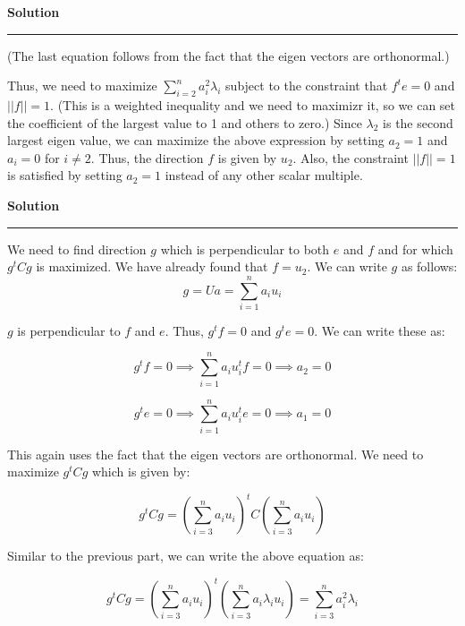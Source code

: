 \documentclass[a4paper,12pt]{article}
\newenvironment{solution}[2][]{%
    \begin{mdframed}[linecolor=blue!70!black, linewidth=2pt, roundcorner=10pt, backgroundcolor=yellow!10!white, skipabove=12pt, skipbelow=12pt]%
        \textbf{\large #2}
        \par\noindent\rule{\textwidth}{0.4pt}
}{
    \end{mdframed}
}
\begin{document}
\begin{solution}{Solution}
(The last equation follows from the fact that the eigen vectors are orthonormal.)

Thus, we need to maximize $\sum_{i=2}^n a_{i}^{2}\lambda_{i}$ subject to the constraint that $f^{t}e = 0$ and $||f|| = 1$. (This is a weighted inequality and we need to maximizr it, so we can set the coefficient of the largest value to 1 and others to zero.) Since $\lambda_2$ is the second largest eigen value, we can maximize the above expression by setting $a_2 = 1$ and $a_i = 0$ for $i \neq 2$. Thus, the direction $f$ is given by $u_2$. Also, the constraint $||f|| = 1$ is satisfied by setting $a_2 = 1$ instead of any other scalar multiple.
\end{solution}

\clearpage

\begin{solution}{Solution}
  We need to find direction $g$ which is perpendicular to both $e$ and $f$ and for which $g^{t}Cg$ is maximized. We have already found that $f = u_{2}$. We can write $g$ as follows:
  \begin{equation}
    g = Ua = \sum_{i=1}^{n} a_{i}u_{i}
  \end{equation}

$g$ is perpendicular to $f$ and $e$. Thus, $g^{t}f = 0$ and $g^{t}e = 0$. We can write these as:

\begin{equation}
  g^{t}f = 0 \implies \sum_{i=1}^{n} a_{i}u_{i}^{t}f = 0 \implies a_2 = 0
\end{equation}

\begin{equation}
  g^{t}e = 0 \implies \sum_{i=1}^{n} a_{i}u_{i}^{t}e = 0 \implies a_1 = 0
\end{equation}

This again uses the fact that the eigen vectors are orthonormal. We need to maximize $g^{t}Cg$ which is given by:

\begin{equation}
  g^{t}Cg = {\left(\sum_{i=3}^n a_{i}u_{i}\right)}^t C\left(\sum_{i=3}^n a_{i}u_{i}\right)
\end{equation}

Similar to the previous part, we can write the above equation as:

\begin{equation}
  g^{t}Cg = {\left(\sum_{i=3}^n a_{i}u_{i}\right)}^t \left(\sum_{i=3}^n a_i\lambda_{i}u_{i}\right) = \sum_{i=3}^n a_{i}^{2}\lambda_{i}
\end{equation}


\end{solution}
\end{document}
